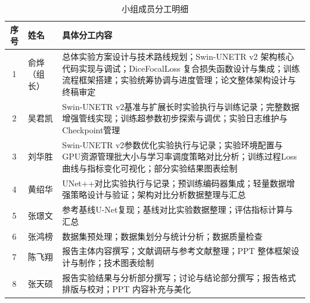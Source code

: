 \documentclass[12pt, a4paper]{article}
\begin{document}
\begin{table}[H]
    \centering
    \small
    \caption{小组成员分工明细}
    \label{tab:division_of_labor}
    \begin{tabular}{@{}clp{12cm}@{}}
        \toprule
        \textbf{序号} & \textbf{姓名} & \textbf{具体分工内容} \\
        \midrule
        1 & 俞烨（组长） &
        总体实验方案设计与技术路线规划；Swin-UNETR v2 架构核心代码实现与调试；DiceFocalLoss 复合损失函数设计与集成；训练流程框架搭建；实验统筹协调与进度管理；论文整体架构设计与终稿审定 \\[4pt]
        2 & 吴君凯 &
        Swin-UNETR v2基准与扩展长时实验执行与训练记录；完整数据增强管线实现；训练超参数初步探索与调优；实验日志维护与Checkpoint管理 \\[4pt]
        3 & 刘华胜 &
        Swin-UNETR v2参数优化实验执行与记录；实验环境配置与GPU资源管理批大小与学习率调度策略对比分析；训练过程Loss曲线与指标变化可视化；部分实验结果图表绘制 \\[4pt]
        4 & 黄绍华 &
        UNet++对比实验执行与记录；预训练编码器集成；轻量数据增强策略设计与验证；架构对比分析数据整理与汇总 \\[4pt]
        5 & 张璟文 &
        参考基线U-Net复现；基线对比实验数据整理；评估指标计算与汇总 \\[4pt]
        6 & 张鸿榜 &
        数据集预处理；数据集划分与统计分析；数据质量检查 \\[4pt]
        7 & 陈飞翔 &
        报告主体内容撰写；文献调研与参考文献整理；PPT 整体框架设计与制作；技术图表绘制 \\[4pt]
        8 & 张天硕 &
        报告实验结果与分析部分撰写；讨论与结论部分撰写；报告格式排版与校对；PPT 内容补充与美化 \\
        \bottomrule
    \end{tabular}
\end{table}

\clearpage

\thispagestyle{empty}
\end{document}
